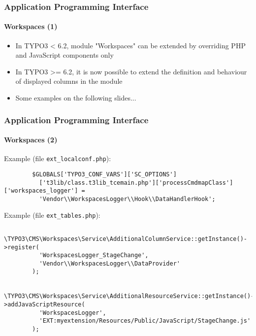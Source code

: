 
\begin{frame}[fragile]
	\frametitle{Application Programming Interface}
	\framesubtitle{Workspaces (1)}

	\begin{itemize}
		\item In TYPO3 < 6.2, module "Workspaces" can be extended by overriding PHP and JavaScript components only
		\item In TYPO3 >= 6.2, it is now possible to extend the definition and behaviour of displayed columns in the module
		\item Some examples on the following slides...
	\end{itemize}

\end{frame}


\begin{frame}[fragile]
	\frametitle{Application Programming Interface}
	\framesubtitle{Workspaces (2)}

	\lstset{
		basicstyle=\tiny\ttfamily
	}

	Example (file \texttt{ext\_localconf.php}):

	\begin{lstlisting}
		$GLOBALS['TYPO3_CONF_VARS']['SC_OPTIONS']
		  ['t3lib/class.t3lib_tcemain.php']['processCmdmapClass']['workspaces_logger'] =
		  'Vendor\\WorkspacesLogger\\Hook\\DataHandlerHook';
	\end{lstlisting}

	Example (file \texttt{ext\_tables.php}):

	\begin{lstlisting}
		\TYPO3\CMS\Workspaces\Service\AdditionalColumnService::getInstance()->register(
		  'WorkspacesLogger_StageChange',
		  'Vendor\\WorkspacesLogger\\DataProvider'
		);

		\TYPO3\CMS\Workspaces\Service\AdditionalResourceService::getInstance()->addJavaScriptResource(
		  'WorkspacesLogger',
		  'EXT:myextension/Resources/Public/JavaScript/StageChange.js'
		);
	\end{lstlisting}

\end{frame}

